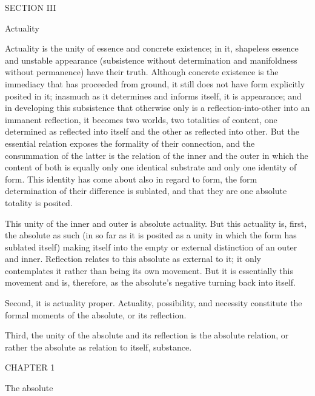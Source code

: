 SECTION III

Actuality

Actuality is the unity of essence and concrete existence;
in it, shapeless essence and unstable appearance
(subsistence without determination
and manifoldness without permanence)
have their truth.
Although concrete existence is the immediacy
that has proceeded from ground,
it still does not have form explicitly posited in it;
inasmuch as it determines and informs itself, it is appearance;
and in developing this subsistence that otherwise only is
a reflection-into-other into an immanent reflection,
it becomes two worlds, two totalities of content,
one determined as reflected into itself
and the other as reflected into other.
But the essential relation exposes
the formality of their connection,
and the consummation of the latter is
the relation of the inner and the outer
in which the content of both is equally
only one identical substrate
and only one identity of form.
This identity has come about also in regard to form,
the form determination of their difference is sublated,
and that they are one absolute totality is posited.

This unity of the inner and outer is absolute actuality.
But this actuality is, first, the absolute as such
(in so far as it is posited as a unity
in which the form has sublated itself)
making itself into the empty or external 
distinction of an outer and inner.
Reflection relates to this absolute 
as external to it;
it only contemplates it 
rather than being its own movement.
But it is essentially this movement
and is, therefore, as the absolute's
negative turning back into itself.

Second, it is actuality proper.
Actuality, possibility, and necessity constitute
the formal moments of the absolute, 
or its reflection.

Third, the unity of the absolute 
and its reflection is
the absolute relation,
or rather the absolute as
relation to itself, substance.

CHAPTER 1

The absolute

